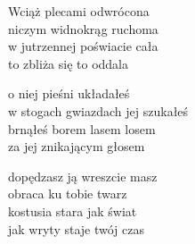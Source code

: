\begin{text}
    Wciąż plecami odwrócona\\
    niczym widnokrąg ruchoma\\
    w jutrzennej poświacie cała\\
    to zbliża się to oddala

    o niej pieśni układałeś\\
    w stogach gwiazdach jej szukałeś\\
    brnąłeś borem lasem losem\\
    za jej znikającym głosem

    dopędzasz ją wreszcie masz\\
    obraca ku tobie twarz\\
    kostusia stara jak świat\\
    jak wryty staje twój czas
\end{text}
\begin{chord}

\end{chord}
